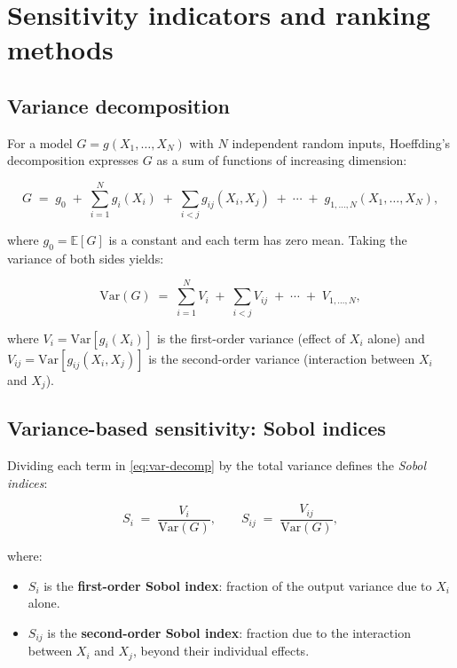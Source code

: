 \section{Sensitivity indicators and ranking methods} \label{sec:sensitivity-indicators}
\subsection{Variance decomposition} \label{sec:var-decomp}

For a model $G = g(X_1, \ldots, X_N)$ with $N$ independent random inputs, Hoeffding's decomposition expresses $G$ as a sum of functions of increasing dimension:

\begin{equation}
    G \;=\; g_0
    \;+\; \sum_{i=1}^{N} g_i(X_i)
    \;+\; \sum_{i<j} g_{ij}(X_i, X_j)
    \;+\; \cdots
    \;+\; g_{1,\ldots,N}(X_1,\ldots,X_N),
    \label{eq:hoeffding}
\end{equation}

where $g_0 = \mathbb{E}[G]$ is a constant and each term has zero mean. Taking the variance of both sides yields:

\begin{equation}
    \mathrm{Var}(G) \;=\;
    \sum_{i=1}^{N} V_i
    \;+\; \sum_{i<j} V_{ij}
    \;+\; \cdots
    \;+\; V_{1,\ldots,N},
    \label{eq:var-decomp}
\end{equation}

where $V_i = \mathrm{Var}[g_i(X_i)]$ is the first-order variance (effect of $X_i$ alone) and $V_{ij} = \mathrm{Var}[g_{ij}(X_i,X_j)]$ is the second-order variance (interaction between $X_i$ and $X_j$).

\subsection{Variance-based sensitivity: Sobol indices} \label{sec:sobol}

Dividing each term in \cref{eq:var-decomp} by the total variance defines the \emph{Sobol indices}:

\begin{equation}
    S_i \;=\; \frac{V_i}{\mathrm{Var}(G)},
    \qquad
    S_{ij} \;=\; \frac{V_{ij}}{\mathrm{Var}(G)},
    \label{eq:sobol-indices}
\end{equation}

where:

\begin{itemize}
    \item $S_i$ is the \textbf{first-order Sobol index}: fraction of the output variance due to $X_i$ alone.
    \item $S_{ij}$ is the \textbf{second-order Sobol index}: fraction due to the interaction between $X_i$ and $X_j$, beyond their individual effects.
\end{itemize}


